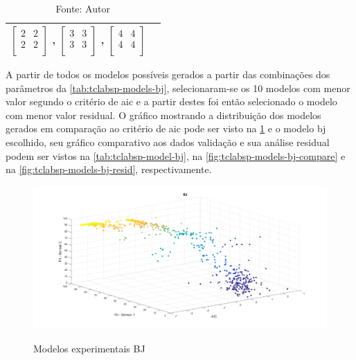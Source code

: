 \begin{table}[h]
\begin{tabular}{c|c}
							$ \begin{bmatrix}	2	&	2	\\	2	&	2	\\	\end{bmatrix} $	,		
							$ \begin{bmatrix}	3	&	3	\\	3	&	3	\\	\end{bmatrix} $	,		
							$ \begin{bmatrix}	4	&	4	\\	4	&	4	\\	\end{bmatrix} $		\\ \bottomrule
	\end{tabular}
	\caption*{Fonte: Autor}
\end{table}

A partir de todos os modelos possíveis gerados a partir das combinações dos parâmetros da \cref{tab:tclabsp-models-bj},
selecionaram-se os 10 modelos com menor valor segundo o critério de \acrshort{aic} e a partir destes foi então
selecionado o modelo com menor valor residual.
O gráfico mostrando a distribuição dos modelos gerados em comparação ao critério de \acrshort{aic} pode ser
visto na \cref{fig:tclabsp-models-bj} e o modelo \acrshort{bj} escolhido, seu gráfico comparativo aos dados validação
e sua análise residual podem ser vistos na \cref{tab:tclabsp-model-bj}, na \cref{fig:tclabsp-models-bj-compare} e na
\cref{fig:tclabsp-models-bj-resid}, respectivamente.

\begin{figure}[h]
	\caption{Modelos experimentais BJ}
	\begin{center}
		\includegraphics[width=1.00\textwidth]{./5_images/tclabsp-models-BJ.png} 
		\label{fig:tclabsp-models-bj}
	\end{center}
	\centering
\end{figure}

